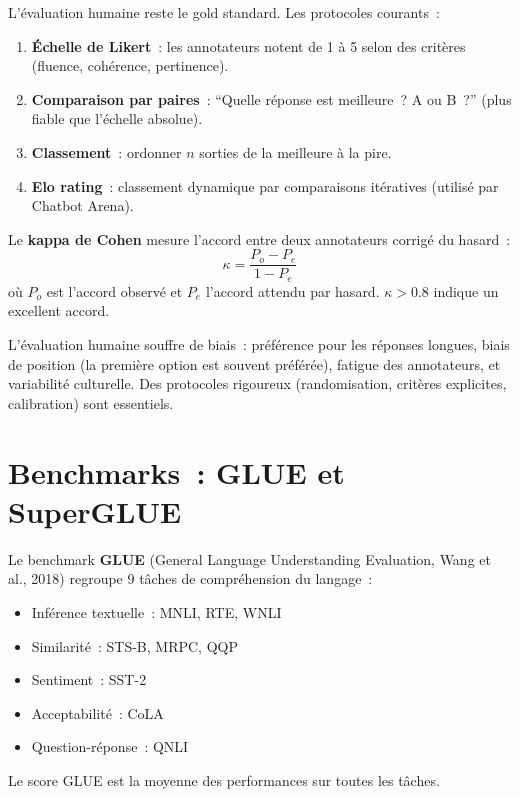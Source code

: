 \begin{definition}
L'\'evaluation humaine reste le gold standard. Les protocoles courants~:
\begin{enumerate}
    \item \textbf{\'Echelle de Likert}~: les annotateurs notent de 1 \`a 5
    selon des crit\`eres (fluence, coh\'erence, pertinence).
    \item \textbf{Comparaison par paires}~: ``Quelle r\'eponse est
    meilleure~? A ou B~?'' (plus fiable que l'\'echelle absolue).
    \item \textbf{Classement}~: ordonner $n$ sorties de la meilleure \`a
    la pire.
    \item \textbf{Elo rating}~: classement dynamique par comparaisons
    it\'eratives (utilis\'e par Chatbot Arena).
\end{enumerate}
\end{definition}

\begin{definition}
Le \textbf{kappa de Cohen} mesure l'accord entre deux annotateurs
corrig\'e du hasard~:
\[
    \kappa = \frac{P_o - P_e}{1 - P_e}
\]
o\`u $P_o$ est l'accord observ\'e et $P_e$ l'accord attendu par hasard.
$\kappa > 0.8$ indique un excellent accord.
\end{definition}

\begin{attention}[title=\textbf{Biais de l'\'evaluation humaine}]
L'\'evaluation humaine souffre de biais~: pr\'ef\'erence pour les
r\'eponses longues, biais de position (la premi\`ere option est souvent
pr\'ef\'er\'ee), fatigue des annotateurs, et variabilit\'e culturelle.
Des protocoles rigoureux (randomisation, crit\`eres explicites,
calibration) sont essentiels.
\end{attention}

\section{Benchmarks~: GLUE et SuperGLUE}
\label{sec:eval:benchmarks}

\begin{definition}[GLUE]
Le benchmark \textbf{GLUE} (General Language Understanding Evaluation,
Wang et al., 2018) regroupe 9 t\^aches de compr\'ehension du langage~:
\begin{itemize}
    \item Inf\'erence textuelle~: MNLI, RTE, WNLI
    \item Similarit\'e~: STS-B, MRPC, QQP
    \item Sentiment~: SST-2
    \item Acceptabilit\'e~: CoLA
    \item Question-r\'eponse~: QNLI
\end{itemize}
Le score GLUE est la moyenne des performances sur toutes les t\^aches.
\end{definition}

